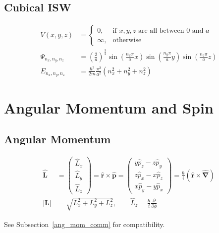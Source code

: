 \subsection{Cubical ISW}
\noindent\begin{align*}
    V(x,y,z)           & =\begin{cases}0,&\text{if }x,y,z\text{ are all between }0\text{ and }a\\\infty,&\text{otherwise}\end{cases}                                            \\
    \Psi_{n_x,n_y,n_z} & ={\left(\frac{2}{a}\right)}^{\frac{3}{2}} \sin\left(\frac{n_{x}\pi}{a}x\right)\sin\left(\frac{n_{y}\pi}{a}y\right)\sin\left(\frac{n_{z}\pi}{a}z\right) \\
    E_{n_x,n_y,n_z}    & = \frac{\hbar^{2}}{2m} \frac{\pi^{2}}{a^{2}} \left(n_{x}^{2}+n_{y}^{2}+n_{z}^{2}\right)
\end{align*}

\section{Angular Momentum and Spin}
\subsection{Angular Momentum}
\noindent\begin{align*}
    \widehat{\mathbf{L}} & =
    \begin{pmatrix}
        \widehat{L}_x \\
        \widehat{L}_y \\
        \widehat{L}_z
    \end{pmatrix}
    =\widehat{\mathbf{r}}\times\widehat{\mathbf{p}}
    =
    \begin{pmatrix}
        y\widehat{p}_z-z\widehat{p}_y \\
        z\widehat{p}_x-x\widehat{p}_z \\
        x\widehat{p}_y-y\widehat{p}_x
    \end{pmatrix}
    =\frac{\hbar}{i}(\mathbf{\widehat{r}}\times\widehat{\mathbf{\nabla}})                                                                \\
    |\mathbf{L}|         & =\sqrt{L_{x}^{2}+L_{y}^{2}+L_{z}^{2}},  \qquad \widehat{L}_z = \frac{\hbar}{i} \frac{\partial}{\partial \phi}
\end{align*}

See Subsection~\ref{ang_mom_comm} for compatibility.

